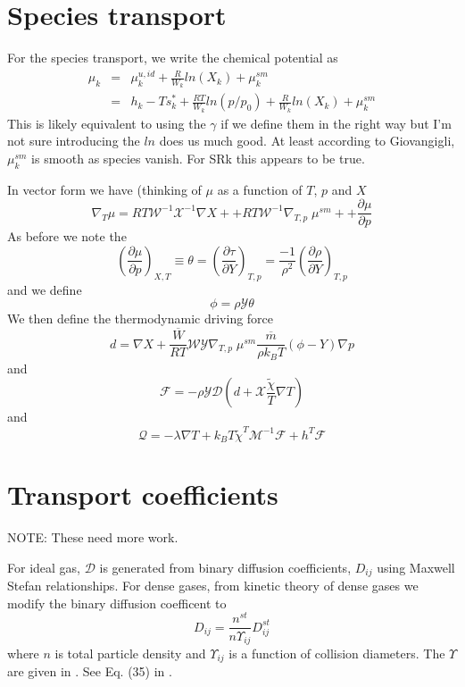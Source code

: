 \documentclass[11pt]{article}
\newcommand{\HeatFlux}{\boldsymbol{\mathcal{Q}}}
\newcommand{\SpeciesFlux}{\boldsymbol{\mathcal{F}}}
\newcommand{\mbar}{\overline{m}}
\begin{document}
\section{Species transport}

For the species transport, we write the chemical potential as
\begin{eqnarray}
\mu_k &=& \mu_k^{u,id} + \frac{R}{W_k} ln(X_k)  +  \mu_k^{sm} \\
 &=& h_k - T s_k^* + \frac{R T}{W_k} ln(p/p_0) + \frac{R}{W_k} ln(X_k) + \mu_k^{sm}
\end{eqnarray}
This is likely equivalent to using the $\gamma$ if we define them in the right way but I'm not sure
introducing the $ln$ does us much good.
At least according to Giovangigli, $\mu_k^{sm}$ is smooth as species vanish.  For SRk this appears to be true.

In vector form we have (thinking of $\mu$ as a function of $T$, $p$ and $X$
\begin{equation}
\nabla_T \mu
= R T \mathcal{W}^{-1} \mathcal{X}^{-1} \nabla X +
+ R T \mathcal{W}^{-1} \nabla_{T,p} \; \mu^{sm} +
+ \frac{\partial \mu}{\partial p}
\end{equation}
As before we note the
\[
\left(\frac{\partial \mu}{\partial p}\right)_{X,T} \equiv \theta = \left(\frac{ \partial \tau}{\partial Y}\right)_{T,p}
 =
\frac{-1}{\rho^2}\left (\frac{\partial \rho}{\partial Y} \right)_{T,p}
\]
and we define
\[
\phi = \rho \mathcal{Y} \theta
\]
We then define the thermodynamic driving force
\[
d = \nabla X  + \frac{\overline{W}}{R T} \mathcal{W} \mathcal{Y} \nabla_{T,p} \; \mu^{sm}  \frac{\mbar}{\rho k_B T} (\phi - Y) \nabla p
\]
and
\[
\mathcal{F} = - \rho \mathcal{Y} \mathcal{D} ( d + \mathcal{X} \frac{ \tilde{\chi}}{T} \nabla T)
\]
and
\[
\HeatFlux = - \lambda \nabla T + k_B T {\tilde{\chi}}^T \mathcal{M}^{-1} \SpeciesFlux + h^T \SpeciesFlux
\]

\section{Transport coefficients}

NOTE:  These need more work.

For ideal gas, $\mathcal{D}$ is generated from binary diffusion coefficients, $D_{ij}$ using
Maxwell Stefan relationships.
For dense gases, from kinetic theory of dense gases we modify the binary diffusion coefficent to
\[
D_{ij} = \frac{n^{st}}{n \Upsilon_{ij}} D_{ij}^{st}
\]
where $n$ is total particle density and $\Upsilon_{ij}$ is a function of collision diameters.
The $\Upsilon$ are given in \cite{KurochkinETAL:1984}.
See Eq. (35) in \cite{giovangigli_CTM:2011}.
\end{document}
